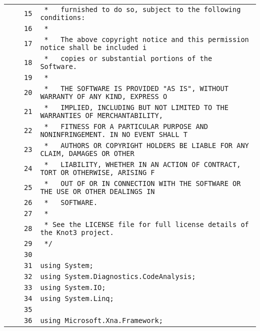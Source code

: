 \documentclass[a4paper,10pt]{article}
\begin{document}
\begin{longtable}[l]{lrrl}
\cellcolor{gray} &  & \verb~15~ & \verb~ *   furnished to do so, subject to the following conditions:~\\
\cellcolor{gray} &  & \verb~16~ & \verb~ *~\\
\cellcolor{gray} &  & \verb~17~ & \verb~ *   The above copyright notice and this permission notice shall be included i~\\
\cellcolor{gray} &  & \verb~18~ & \verb~ *   copies or substantial portions of the Software.~\\
\cellcolor{gray} &  & \verb~19~ & \verb~ *~\\
\cellcolor{gray} &  & \verb~20~ & \verb~ *   THE SOFTWARE IS PROVIDED "AS IS", WITHOUT WARRANTY OF ANY KIND, EXPRESS O~\\
\cellcolor{gray} &  & \verb~21~ & \verb~ *   IMPLIED, INCLUDING BUT NOT LIMITED TO THE WARRANTIES OF MERCHANTABILITY,~\\
\cellcolor{gray} &  & \verb~22~ & \verb~ *   FITNESS FOR A PARTICULAR PURPOSE AND NONINFRINGEMENT. IN NO EVENT SHALL T~\\
\cellcolor{gray} &  & \verb~23~ & \verb~ *   AUTHORS OR COPYRIGHT HOLDERS BE LIABLE FOR ANY CLAIM, DAMAGES OR OTHER~\\
\cellcolor{gray} &  & \verb~24~ & \verb~ *   LIABILITY, WHETHER IN AN ACTION OF CONTRACT, TORT OR OTHERWISE, ARISING F~\\
\cellcolor{gray} &  & \verb~25~ & \verb~ *   OUT OF OR IN CONNECTION WITH THE SOFTWARE OR THE USE OR OTHER DEALINGS IN~\\
\cellcolor{gray} &  & \verb~26~ & \verb~ *   SOFTWARE.~\\
\cellcolor{gray} &  & \verb~27~ & \verb~ *~\\
\cellcolor{gray} &  & \verb~28~ & \verb~ * See the LICENSE file for full license details of the Knot3 project.~\\
\cellcolor{gray} &  & \verb~29~ & \verb~ */~\\
\cellcolor{gray} &  & \verb~30~ & \verb~~\\
\cellcolor{gray} &  & \verb~31~ & \verb~using System;~\\
\cellcolor{gray} &  & \verb~32~ & \verb~using System.Diagnostics.CodeAnalysis;~\\
\cellcolor{gray} &  & \verb~33~ & \verb~using System.IO;~\\
\cellcolor{gray} &  & \verb~34~ & \verb~using System.Linq;~\\
\cellcolor{gray} &  & \verb~35~ & \verb~~\\
\cellcolor{gray} &  & \verb~36~ & \verb~using Microsoft.Xna.Framework;~\\

\end{longtable}
\end{document}
